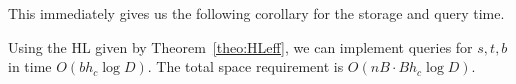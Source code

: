 This immediately gives us the following corollary for the storage and query time.
\begin{corollary}
Using the HL given by Theorem~\ref{theo:HLeff}, we can implement queries for $s,t,b$ in time $O(b h_c\log D)$.
The total space requirement is $O(nB \cdot Bh_c\log D)$.
\end{corollary}


